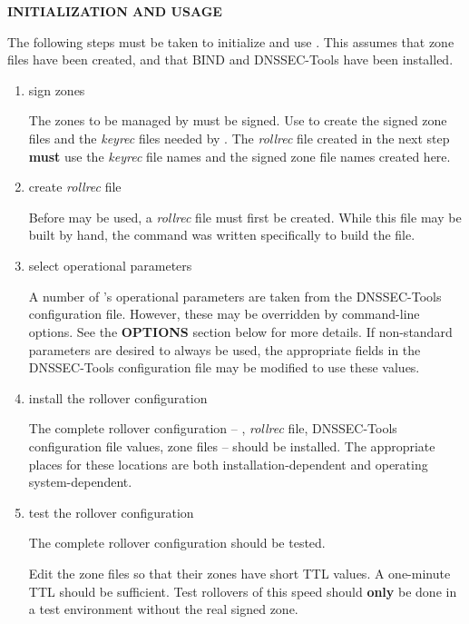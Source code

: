 {\bf INITIALIZATION AND USAGE}

The following steps must be taken to initialize and use .  This
assumes that zone files have been created, and that BIND and DNSSEC-Tools
have been installed.

\begin{enumerate}

\item sign zones\verb" "

The zones to be managed by  must be signed.  Use 
to create the signed zone files and the {\it keyrec} files needed by
.  The {\it rollrec} file created in the next step {\bf must} use
the {\it keyrec} file names and the signed zone file names created here.

\item create {\it rollrec} file\verb" "

Before  may be used, a {\it rollrec} file must first be created.
While this file may be built by hand, the  command was
written specifically to build the file.

\item select operational parameters\verb" "

A number of 's operational parameters are taken from the
DNSSEC-Tools configuration file.  However, these may be overridden
by command-line options.  See the {\bf OPTIONS} section below for more details.
If non-standard parameters are desired to always be used, the appropriate
fields in the DNSSEC-Tools configuration file may be modified to use these
values.

\item install the rollover configuration\verb" "

The complete rollover configuration -- , {\it rollrec} file,
DNSSEC-Tools configuration file values, zone files -- should be installed.  
The appropriate places for these locations are both installation-dependent
and operating system-dependent.

\item test the rollover configuration\verb" "

The complete rollover configuration should be tested.  

Edit the zone files so that their zones have short TTL values.  A one-minute
TTL should be sufficient.  Test rollovers of this speed should {\bf only} be
done in a test environment without the real signed zone.


\end{enumerate}
